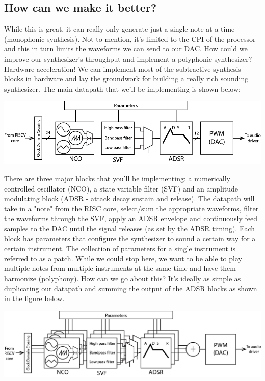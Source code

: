 \documentclass[11pt]{article}
\begin{document}
\subsection{How can we make it better?}

While this is great, it can really only generate just a single note at a time (monophonic synthesis). Not to mention, it's limited to the CPI of the processor and this in turn limits the waveforms we can send to our DAC. How could we improve our synthesizer's throughput and implement a polyphonic synthesizer? Hardware acceleration! We can implement most of the subtractive synthesis blocks in hardware and lay the groundwork for building a really rich sounding synthesizer. The main datapath that we'll be implementing is shown below:

    \begin{center}
    \includegraphics[width=\textwidth]{images/ss_dp_1.png}
    \end{center}

There are three major blocks that you'll be implementing: a numerically controlled oscillator (NCO), a state variable filter (SVF) and an amplitude modulating block (ADSR - attack decay sustain and release). The datapath will take in a "note" from the RISC core, select/sum the appropriate waveforms, filter the waveforms through the SVF, apply an ADSR envelope and continuously feed samples to the DAC until the signal releases (as set by the ADSR timing). Each block has parameters that configure the synthesizer to sound a certain way for a certain instrument. The collection of parameters for a single instrument is referred to as a patch. While we could stop here, we want to be able to play multiple notes from multiple instruments at the same time and have them harmonize (polyphony). How can we go about this? It's ideally as simple as duplicating our datapath and summing the output of the ADSR blocks as shown in the figure below.

    \begin{center}
    \includegraphics[width=\textwidth]{images/ss_dp_2.png}
    \end{center}
\end{document}
